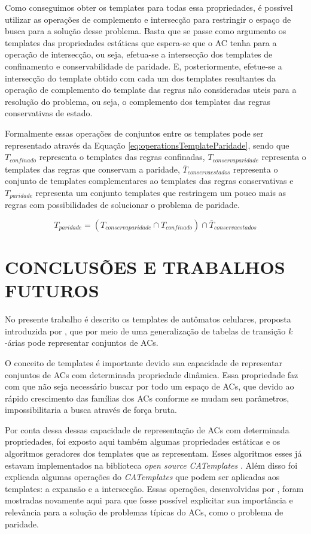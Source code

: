 \documentclass[12pt,a4paper]{article}
\let\stdsection\section
\renewcommand\section{\newpage\stdsection}
\begin{document}
	Como conseguimos obter os templates para todas essa propriedades, é possível utilizar as operações de complemento e intersecção para restringir o espaço de busca para a solução desse problema. Basta que se passe como argumento os templates das propriedades estáticas que espera-se que o AC tenha para a operação de intersecção, ou seja, efetua-se a intersecção dos templates de confinamento e conservabilidade de paridade. E, posteriormente, efetue-se a intersecção do template obtido com cada um dos templates resultantes da operação de complemento do template das regras não consideradas uteis para a resolução do problema, ou seja, o complemento dos templates das regras conservativas de estado.

	Formalmente essas operações de conjuntos entre os templates pode ser representado através da Equação \ref{eq:operationsTemplateParidade}, sendo que $T_{confinado}$ representa o templates das regras confinadas, $T_{conservaparidade}$ representa o templates das regras que conservam a paridade, $\bar{T}_{conservaestados}$ representa o conjunto de templates complementares ao templates das regras conservativas e $T_{paridade}$ representa um conjunto templates que restringem um pouco mais as regras com possibilidades de solucionar o problema de paridade.

	\begin{equation}
	T_{paridade} = (T_{conservaparidade} \cap T_{confinado}) \cap \bar{T}_{conservaestados}
	\label{eq:operationsTemplateParidade}
	\end{equation}





\section{CONCLUSÕES E TRABALHOS FUTUROS}\label{sec:conclusao}
No presente trabalho é descrito os templates de autômatos celulares, proposta introduzida por , que por meio de uma generalização de tabelas de transição $k$-árias pode representar conjuntos de ACs.

O conceito de templates é importante devido sua capacidade de representar conjuntos de ACs com determinada propriedade dinâmica. Essa propriedade faz com que não seja necessário buscar por todo um espaço de ACs, que devido ao rápido crescimento das famílias dos ACs conforme se mudam seu parâmetros, impossibilitaria a busca através de força bruta.

Por conta dessa dessas capacidade de representação de ACs com determinada propriedades, foi exposto aqui também algumas propriedades estáticas e os algoritmos geradores dos templates que as representam. Esses algoritmos esses já estavam implementados na biblioteca \textit{open source} \textit{CATemplates} . Além disso foi explicada algumas operações do \textit{CATemplates} que podem ser aplicadas aos templates: a expansão e a intersecção. Essas operações, desenvolvidas por , foram mostradas novamente aqui para que fosse possível explicitar sua importância e relevância para a solução de problemas típicas do ACs, como o problema de paridade.
\end{document}
